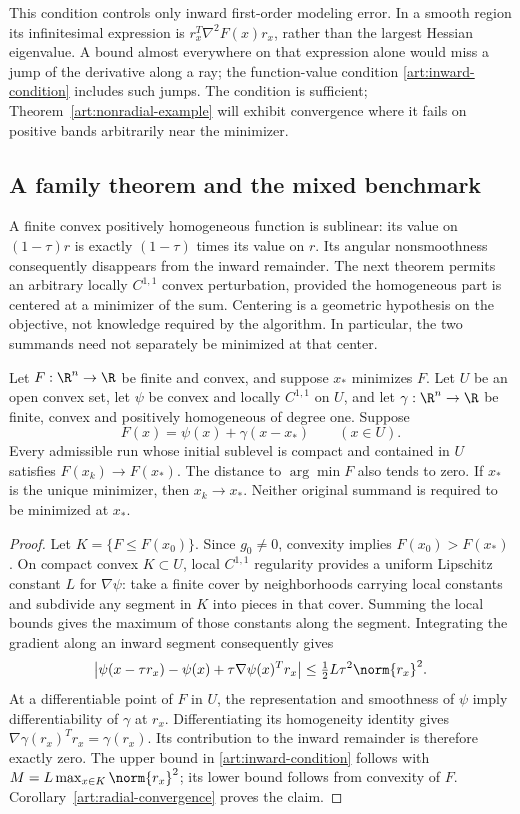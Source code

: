 This condition controls only inward first-order modeling error. In a smooth
region its infinitesimal expression is $r_x^T\nabla^2F(x)r_x$, rather than the
largest Hessian eigenvalue. A bound almost everywhere on that expression alone
would miss a jump of the derivative along a ray; the function-value condition
\eqref{art:inward-condition} includes such jumps. The condition is sufficient;
Theorem~\ref{art:nonradial-example} will exhibit convergence where it fails
on positive bands arbitrarily near the minimizer.

\subsection{A family theorem and the mixed benchmark}

A finite convex positively homogeneous function is sublinear: its value on
$(1-\tau)r$ is exactly $(1-\tau)$ times its value on $r$. Its angular
nonsmoothness consequently disappears from the inward remainder. The next
theorem permits an arbitrary locally $C^{1,1}$ convex perturbation, provided
the homogeneous part is centered at a minimizer of the sum. Centering is a
geometric hypothesis on the objective, not knowledge required by the
algorithm. In particular, the two summands need not separately be minimized
at that center.

\begin{theorem}\label{art:centered}
Let $F:\R^n\to\R$ be finite and convex, and suppose $x_*$ minimizes $F$.
Let $U$ be an open convex set, let $\psi$ be convex and locally $C^{1,1}$ on
$U$, and let $\gamma:\R^n\to\R$ be finite, convex and positively homogeneous
of degree one. Suppose
\[
 F(x)=\psi(x)+\gamma(x-x_*)\qquad(x\in U).
\]
Every admissible run whose initial sublevel is compact and contained in $U$
satisfies $F(x_k)\to F(x_*)$. The distance to $\arg\min F$ also tends to zero. If $x_*$ is the unique
minimizer, then $x_k\to x_*$. Neither original summand is required to be
minimized at $x_*$.
\end{theorem}
\begin{proof}
Let $K=\{F\le F(x_0)\}$. Since $g_0\ne0$, convexity implies
$F(x_0)>F(x_*)$. On compact convex $K\subset U$, local $C^{1,1}$ regularity
provides a uniform Lipschitz constant $L$ for $\nabla\psi$: take a finite
cover by neighborhoods carrying local constants and subdivide any segment in
$K$ into pieces in that cover. Summing the local bounds gives the maximum
of those constants along the segment. Integrating the gradient along an
inward segment consequently gives
\[
 \left|\psi(x-\tau r_x)-\psi(x)
             +\tau\nabla\psi(x)^Tr_x\right|
 \le\tfrac12L\tau^2\norm{r_x}^2.
\]
At a differentiable point of $F$ in $U$, the representation and smoothness of
$\psi$ imply differentiability of $\gamma$ at $r_x$. Differentiating its
homogeneity identity gives $\nabla\gamma(r_x)^Tr_x=\gamma(r_x)$.
Its contribution to the inward remainder is therefore exactly zero.
The upper bound in \eqref{art:inward-condition} follows with
$M=L\max_{x\in K}\norm{r_x}^2$; its lower bound follows from convexity of $F$.
Corollary~\ref{art:radial-convergence} proves the claim.
\end{proof}


